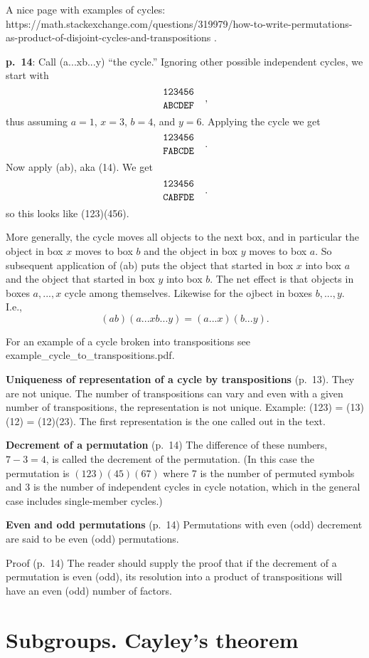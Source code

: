 \documentclass{book}
\begin{document}
A nice page with examples of cycles:
https://math.stackexchange.com/questions/319979/how-to-write-permutations-as-product-of-disjoint-cycles-and-transpositions
.

{\bf p.\ 14}: Call (a...xb...y) ``the cycle.'' Ignoring other possible
independent cycles, we start with
$$
\genfrac{}{}{0pt}0{\tt 123456}{\tt ABCDEF}\quad,
$$
thus assuming $a=1$, $x=3$, $b=4$, and $y=6$. Applying the cycle we get
$$
\genfrac{}{}{0pt}0{\tt 123456}{\tt FABCDE}\quad.
$$
Now apply (ab), aka (14). We get
$$
\genfrac{}{}{0pt}0{\tt 123456}{\tt CABFDE}\quad.
$$
so this looks like (123)(456).

More generally, the cycle moves all objects to the next box, and in
particular the object in box $x$ moves to box $b$ and the object in
box $y$ moves to box $a$. So subsequent application of (ab) puts the
object that started in box $x$ into box $a$ and the object that
started in box $y$ into box $b$. The net effect is that objects in
boxes $a,...,x$ cycle among themselves. Likewise for the ojbect in
boxes $b,...,y$. I.e.,
$$
(ab)(a...xb...y) = (a...x)(b...y).
$$

For an example of a cycle broken into transpositions see
example\_cycle\_to\_transpositions.pdf.

{\bf Uniqueness of representation of a cycle by transpositions}
(p.\ 13). They are not unique. The number of transpositions can vary
and even with a given number of transpositions, the representation is
not unique. Example: (123) = (13)(12) = (12)(23). The first
representation is the one called out in the text.

{\bf Decrement of a permutation} (p.\ 14) The difference of these
numbers, $7-3 = 4$, is called the decrement of the permutation. (In
this case the permutation is $(123)(45)(67)$ where 7 is the number of
permuted symbols and 3 is the number of independent cycles in cycle
notation, which in the general case includes single-member cycles.)

{\bf Even and odd permutations} (p.\ 14) Permutations with even (odd)
decrement are said to be even (odd) permutations.

Proof (p.\ 14) The reader should supply the proof that if the
decrement of a permutation is even (odd), its resolution into a product
of transpositions will have an even (odd) number of factors.

\section{Subgroups. Cayley's theorem}
\end{document}
